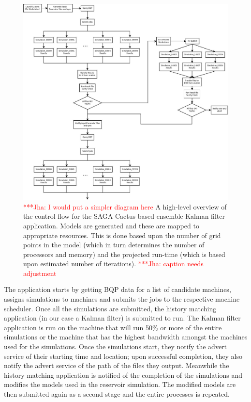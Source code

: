 \documentclass[conference,final]{IEEEtran}
\newcommand{\jhanote}[1]{ {\textcolor{red} { ***Jha: #1 }}}
\begin{document}
\begin{figure}
\begin{center}
\includegraphics[scale=0.18]{./figures/Lazarus_Workflow_Alternate.png}
\end{center}
\caption{\jhanote{I would put a simpler diagram here} A high-level
  overview of the control flow for the SAGA-Cactus based ensemble
  Kalman filter application. Models are generated and these are mapped
  to appropriate resources. This is done based upon the number of grid
  points in the model (which in turn determines the number of
  processors and memory) and the projected run-time (which is based
  upon estimated number of iterations). \jhanote{caption needs
    adjustment}}
\label{fig:controlflow}
\end{figure}

The application starts by getting BQP data for a list of candidate
machines, assigns simulations to machines and submits the jobs to the
respective machine scheduler. Once all the simulations are submitted,
the history matching application (in our case a Kalman filter) is
submitted to run. The Kalman filter application is run on the
machine that will run 50\% or more of the entire simulations or the
machine that has the highest bandwidth amongst the machines used for
the simulations.  Once the simulations start, they notify the advert
service of their starting time and location; upon successful
completion, they also notify the advert service of the path of the
files they output.  Meanwhile the history matching application is
notified of the completion of the simulations and modifies the models
used in the reservoir simulation. The modified models are then
submitted again as a second stage and the entire processes is
repeated.
\end{document}
